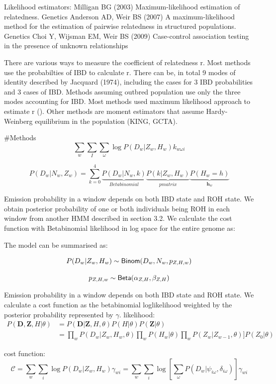 \documentclass[12pt, letterpaper]{article}
\newcommand{\BZ}{\mathbf{Z}}
\begin{document}
Likelihood estimators:
Milligan BG (2003) Maximum-likelihood estimation of relatedness. Genetics
Anderson AD, Weir BS (2007) A maximum-likelihood method for the estimation of pairwise relatedness in structured populations. Genetics
Choi Y, Wijsman EM, Weir BS (2009) Case-control association testing in the presence of unknown relationships

There are various ways to measure the coefficient of relatedness r. Most methods use the probabilties of IBD to calculate r. There can be, in total 9 modes of identity described by Jacquard (1974), including the cases for 3 IBD probabilities and 3 cases of IBD. Methods assuming outbred population use only the three modes accounting for IBD. Most methods used maximum likelihood approach to estimate r (). Other methods are moment estimators that assume Hardy-Weinberg equilibrium in the population (KING, GCTA).

#Methods
$$\sum_{w} \sum_{I}\sum_\omega \log P(D_{w}|Z_w, H_w)k_{w\omega i}$$



$$P(D_w | N_w, Z_w) = \sum_{k=0}^4 
\underbrace{P(D_w | N_w, k)}_{Betabinomial}
\underbrace{P(k | Z_w, H_w)}_{p matrix}
\underbrace{P(H_w =h)}_{\mathbf{h}_w}
$$

Emission probability in a window depends on both IBD state and ROH state. We obtain posterior probability of one or both individuals being ROH in each window from another HMM described in section 3.2. We calculate the cost function with Betabinomial likelihood in log space for the entire genome as:

The model can be summarised as:

\begin{equation}\label{eq:6}
P(D_w|Z_w,H_w) \sim {\sf Binom}(D_w, N_w, p_{Z,H,w})
\end{equation}

\begin{equation}\label{eq:7}
p_{Z,H,w} \sim {\sf Beta}(\alpha_{Z,H}, \beta_{Z,H})
\end{equation}

Emission probability in a window depends on both IBD state and ROH state. We calculate a cost function as the betabinomial loglikelihood weighted by the posterior probability represented by $\gamma$.
likelihood:
\begin{align}
P(\mathbf{D},\BZ, H|\theta) &= P(\mathbf{D}|\mathbf{Z},H,\theta) P(H |\theta) P(\BZ|\theta)\nonumber\\
&= \prod_{w}  P(D_w|Z_w,  H_w, \theta) \prod_w P(H_w | \theta) \prod_{w} P(Z_w|Z_{w-1}, \theta)] P(Z_0| \theta) 
\end{align}

cost function:
\begin{equation}
    \mathcal{C} = 
       \sum_{w} \sum_{i} \log P(D_{w}|Z_w, H_w)\gamma_{wi}=
    \sum_{w} \sum_{i} 
    \log \left[\sum_{\omega}P(D_{w}|\psi_{i\omega},\delta_{i\omega}) \right] \gamma_{wi}
\end{equation}
\end{document}

